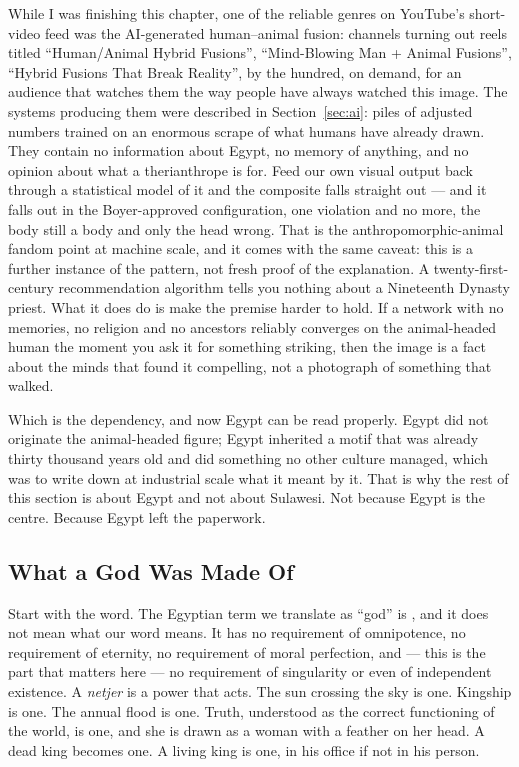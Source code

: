 \begin{funfact}
 While I was
finishing this chapter, one of the reliable genres on YouTube's short-video feed was the
AI-generated human--animal fusion: channels turning out reels titled ``Human/Animal Hybrid
Fusions'', ``Mind-Blowing Man + Animal Fusions'', ``Hybrid Fusions That Break Reality'', by the
hundred, on demand, for an audience that watches them the way people have always watched this
image. The systems producing them were described in Section~\ref{sec:ai}: piles of adjusted
numbers trained on an enormous scrape of what humans have already drawn. They contain no
information about Egypt, no memory of anything, and no opinion about what a therianthrope is
for. Feed our own visual output back through a statistical model of it and the composite falls
straight out --- and it falls out in the Boyer-approved configuration, one violation and no more,
the body still a body and only the head wrong. That is the anthropomorphic-animal fandom point at
machine scale, and it comes with the same caveat: this is a further instance of the pattern, not
fresh proof of the explanation. A twenty-first-century recommendation algorithm tells you nothing
about a Nineteenth Dynasty priest. What it does do is make the premise harder to hold. If a
network with no memories, no religion and no ancestors reliably converges on the animal-headed
human the moment you ask it for something striking, then the image is a fact about the minds that
found it compelling, not a photograph of something that walked.
\end{funfact}

Which is the dependency, and now Egypt can be read properly. Egypt did not originate the
animal-headed figure; Egypt inherited a motif that was already thirty thousand years old and did
something no other culture managed, which was to write down at industrial scale what it meant by
it. That is why the rest of this section is about Egypt and not about Sulawesi. Not because Egypt
is the centre. Because Egypt left the paperwork.

\subsection{What a God Was Made Of}\label{sec:netjer}

Start with the word. The Egyptian term we translate as ``god'' is , and it does
not mean what our word means. It has no requirement of omnipotence, no requirement of eternity,
no requirement of moral perfection, and --- this is the part that matters here --- no requirement
of singularity or even of independent existence. A \emph{netjer} is a power that acts. The sun
crossing the sky is one. Kingship is one. The annual flood is one. Truth, understood as the
correct functioning of the world, is one, and she is drawn as a woman with a feather on her head.
A dead king becomes one. A living king is one, in his office if not in his person.

